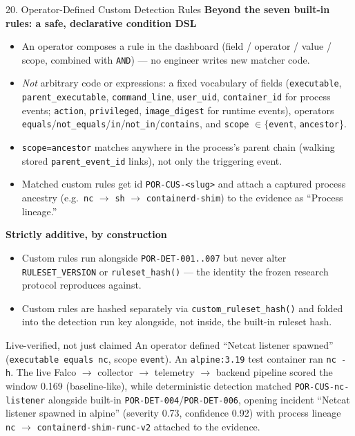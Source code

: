 \documentclass[aspectratio=169, 11pt]{beamer}
\begin{document}
\begin{frame}{20. Operator-Defined Custom Detection Rules}
    \footnotesize
    \textbf{Beyond the seven built-in rules: a safe, declarative condition DSL}
    \begin{itemize}\setlength\itemsep{2pt}
        \item An operator composes a rule in the dashboard (field / operator / value / scope, combined with \texttt{AND}) --- no engineer writes new matcher code.
        \item \emph{Not} arbitrary code or expressions: a fixed vocabulary of fields (\texttt{executable}, \texttt{parent\_executable}, \texttt{command\_line}, \texttt{user\_uid}, \texttt{container\_id} for process events; \texttt{action}, \texttt{privileged}, \texttt{image\_digest} for runtime events), operators \texttt{equals}/\texttt{not\_equals}/\texttt{in}/\texttt{not\_in}/\texttt{contains}, and \texttt{scope} $\in\{$\texttt{event}, \texttt{ancestor}\}.
        \item \texttt{scope=ancestor} matches anywhere in the process's parent chain (walking stored \texttt{parent\_event\_id} links), not only the triggering event.
        \item Matched custom rules get id \texttt{POR-CUS-<slug>} and attach a captured process ancestry (e.g.\ \texttt{nc} $\to$ \texttt{sh} $\to$ \texttt{containerd-shim}) to the evidence as ``Process lineage.''
    \end{itemize}
    \vspace{0.1cm}
    \textbf{Strictly additive, by construction}
    \begin{itemize}\setlength\itemsep{2pt}
        \item Custom rules run alongside \texttt{POR-DET-001..007} but never alter \texttt{RULESET\_VERSION} or \texttt{ruleset\_hash()} --- the identity the frozen research protocol reproduces against.
        \item Custom rules are hashed separately via \texttt{custom\_ruleset\_hash()} and folded into the detection run key alongside, not inside, the built-in ruleset hash.
    \end{itemize}
    \begin{block}{\scriptsize Live-verified, not just claimed}
        \scriptsize An operator defined ``Netcat listener spawned'' (\texttt{executable equals nc}, scope \texttt{event}). An \texttt{alpine:3.19} test container ran \texttt{nc -h}. The live Falco $\to$ collector $\to$ telemetry $\to$ backend pipeline scored the window 0.169 (baseline-like), while deterministic detection matched \texttt{POR-CUS-nc-listener} alongside built-in \texttt{POR-DET-004}/\texttt{POR-DET-006}, opening incident ``Netcat listener spawned in alpine'' (severity 0.73, confidence 0.92) with process lineage \texttt{nc} $\to$ \texttt{containerd-shim-runc-v2} attached to the evidence.
    \end{block}
\end{frame}
\end{document}
